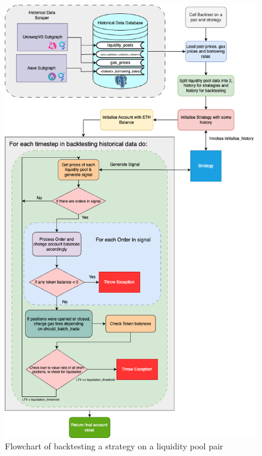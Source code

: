 \begin{figure}[H]
    \centering
    \includegraphics[width=0.99\textwidth]{project/Images/backtesting-diagram.png}
    \caption{Flowchart of backtesting a strategy on a liquidity pool pair \label{fig:backtesting-flow}}
\end{figure}

